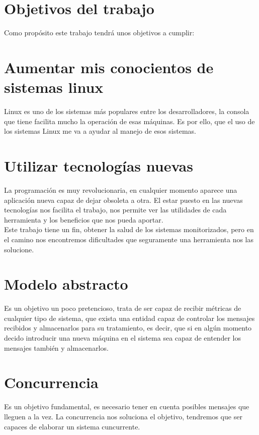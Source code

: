 \documentclass[ spanish, a4paper, 12pt, twoside]{report}
\begin{document}
\section{Objetivos del trabajo}
Como propósito este trabajo tendrá unos objetivos a cumplir:\\

\section{Aumentar mis conocientos de sistemas linux}
Linux es uno de los sistemas más populares entre los desarrolladores, la consola que tiene facilita mucho la operación de esas 
máquinas. Es por ello, que el uso de los sistemas Linux me va a ayudar al manejo de esos sistemas.\\

\section{Utilizar tecnologías nuevas}
La programación es muy revolucionaria, en cualquier momento aparece una aplicación nueva capaz de dejar obsoleta a otra. 
El estar puesto en las nuevas tecnologías nos facilita el trabajo, nos permite ver las utilidades de cada herramienta y los
beneficios que nos pueda aportar. \\

Este trabajo tiene un fin, obtener la salud de los sistemas monitorizados, pero en el camino nos encontremos dificultades que 
seguramente una herramienta nos las solucione. \\

\section{Modelo abstracto}
Es un objetivo un poco pretencioso, trata de ser capaz de recibir métricas de cualquier tipo de sistema, que exista una entidad
capaz de controlar los mensajes recibidos y almacenarlos para su tratamiento, es decir, que si en algún momento decido introducir 
una nueva máquina en el sistema sea capaz de entender los mensajes también y almacenarlos. \\
\section{Concurrencia}
Es un objetivo fundamental, es necesario tener en cuenta posibles mensajes que lleguen a la vez. La concurrencia nos soluciona el 
objetivo, tendremos que ser capaces de elaborar un sistema cuncurrente.
\end{document}
